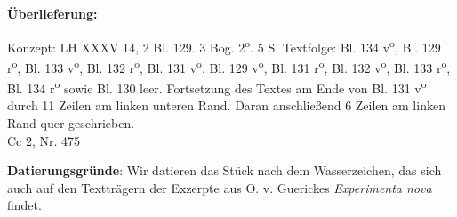       
               
                \begin{ledgroupsized}[r]{120mm}
                \footnotesize 
                \pstart                
                \noindent\textbf{\"{U}berlieferung:}   
                \pend
                \end{ledgroupsized}
            
              
                            \begin{ledgroupsized}[r]{114mm}
                            \footnotesize 
                            \pstart \parindent -6mm
                            Konzept: LH XXXV 14, 2 Bl. 129. 3 Bog. 2\textsuperscript{o}. 5 S. Textfolge: Bl. 134 v\textsuperscript{o}, Bl. 129 r\textsuperscript{o}, Bl. 133 v\textsuperscript{o}, Bl. 132 r\textsuperscript{o}, Bl. 131 v\textsuperscript{o}. Bl. 129 v\textsuperscript{o}, Bl. 131 r\textsuperscript{o}, Bl. 132 v\textsuperscript{o}, Bl. 133 r\textsuperscript{o}, Bl. 134 r\textsuperscript{o} sowie Bl. 130 leer. Fortsetzung des Textes am Ende von Bl. 131 v\textsuperscript{o} durch 11 Zeilen am linken unteren Rand. Daran anschließend 6 Zeilen am linken Rand quer geschrieben.\\Cc 2, Nr. 475 \pend
                            \end{ledgroupsized}
                \vspace*{5mm}
                \begin{ledgroup}
                \footnotesize 
                \pstart
            \noindent\footnotesize{\textbf{Datierungsgr\"{u}nde}: Wir datieren das St\"{u}ck nach dem Wasserzeichen, das sich auch auf den Texttr\"{a}gern der Exzerpte aus O. v. Guerickes \cite{00055}\textit{Experimenta nova} findet.}
                \pend
                \end{ledgroup}
            
